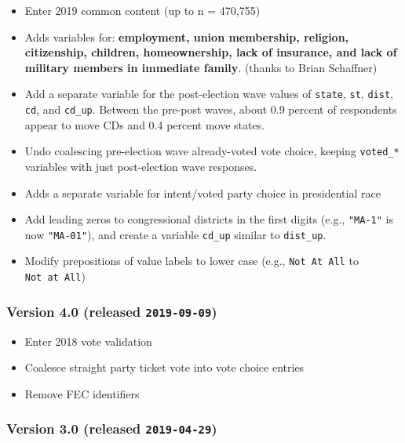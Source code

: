 \documentclass[10pt,article,oneside]{memoir}
\begin{document}
\begin{itemize}
\tightlist
\item
  Enter 2019 common content (up to n = 470,755)
\item
  Adds variables for: \textbf{employment, union membership, religion,
  citizenship, children, homeownership, lack of insurance, and lack of
  military members in immediate family}. (thanks to Brian Schaffner)
\item
  Add a separate variable for the post-election wave values of
  \texttt{state}, \texttt{st}, \texttt{dist}, \texttt{cd}, and
  \texttt{cd\_up}. Between the pre-post waves, about 0.9 percent of
  respondents appear to move CDs and 0.4 percent move states.
\item
  Undo coalescing pre-election wave already-voted vote choice, keeping
  \texttt{voted\_*} variables with just post-election wave responses.
\item
  Adds a separate variable for intent/voted party choice in presidential
  race
\item
  Add leading zeros to congressional districts in the first digits
  (e.g., \texttt{"MA-1"} is now \texttt{"MA-01"}), and create a variable
  \texttt{cd\_up} similar to \texttt{dist\_up}.
\item
  Modify prepositions of value labels to lower case (e.g.,
  \texttt{Not\ At\ All} to \texttt{Not\ at\ All})
\end{itemize}

\subsubsection{\texorpdfstring{Version 4.0 (released
\texttt{2019-09-09})}{Version 4.0 (released 2019-09-09)}}\label{version-4.0-released-2019-09-09}

\begin{itemize}
\tightlist
\item
  Enter 2018 vote validation
\item
  Coalesce straight party ticket vote into vote choice entries
\item
  Remove FEC identifiers
\end{itemize}

\subsubsection{\texorpdfstring{Version 3.0 (released
\texttt{2019-04-29})}{Version 3.0 (released 2019-04-29)}}\label{version-3.0-released-2019-04-29}
\end{document}

